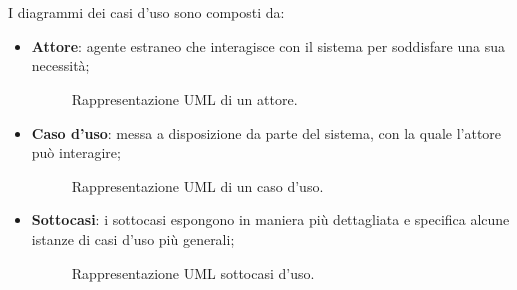 \\\\
I diagrammi dei casi d'uso sono composti da:\\
\begin{itemize}
    \item \textbf{Attore}: agente estraneo che interagisce con il sistema per soddisfare una sua necessità;
        \begin{figure}[H]
            \centering
            \caption{Rappresentazione UML di un attore.}
            \label{fig:Rappresentazione UML di un attore}
        \end{figure}
    \item \textbf{Caso d'uso}:  messa a disposizione da parte del sistema, con la quale l'attore può interagire;
        \begin{figure}[H]
        \centering
        \caption{Rappresentazione UML di un caso d'uso.}
        \label{fig:Rappresentazione UML di un caso d'uso}
        \end{figure}
    \item \textbf{Sottocasi}: i sottocasi espongono in maniera più dettagliata e specifica alcune istanze di casi d'uso più generali; 
    \begin{figure}[H]
        \centering
        \caption{Rappresentazione UML sottocasi d'uso.}
        \label{fig:Rappresentazione UML sottocasi d'uso}
    \end{figure}

\end{itemize}
